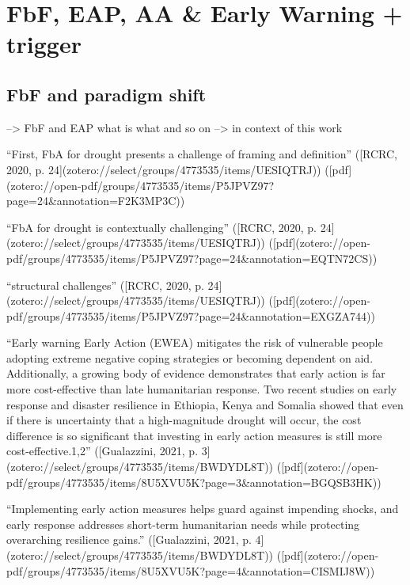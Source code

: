 {\section{FbF, EAP, AA & Early Warning + trigger}

\subsection{FbF and paradigm shift}
--> FbF and EAP what is what and so on --> in context of this work


“First, FbA for drought presents a challenge of framing and definition” ([RCRC, 2020, p. 24](zotero://select/groups/4773535/items/UESIQTRJ)) ([pdf](zotero://open-pdf/groups/4773535/items/P5JPVZ97?page=24&annotation=F2K3MP3C))

“FbA for drought is contextually challenging” ([RCRC, 2020, p. 24](zotero://select/groups/4773535/items/UESIQTRJ)) ([pdf](zotero://open-pdf/groups/4773535/items/P5JPVZ97?page=24&annotation=EQTN72CS))

“structural challenges” ([RCRC, 2020, p. 24](zotero://select/groups/4773535/items/UESIQTRJ)) ([pdf](zotero://open-pdf/groups/4773535/items/P5JPVZ97?page=24&annotation=EXGZA744))

“Early warning Early Action (EWEA) mitigates the risk of vulnerable people adopting extreme negative coping strategies or becoming dependent on aid. Additionally, a growing body of evidence demonstrates that early action is far more cost-effective than late humanitarian response. Two recent studies on early response and disaster resilience in Ethiopia, Kenya and Somalia showed that even if there is uncertainty that a high-magnitude drought will occur, the cost difference is so significant that investing in early action measures is still more cost-effective.1,2” ([Gualazzini, 2021, p. 3](zotero://select/groups/4773535/items/BWDYDL8T)) ([pdf](zotero://open-pdf/groups/4773535/items/8U5XVU5K?page=3&annotation=BGQSB3HK))

“Implementing early action measures helps guard against impending shocks, and early response addresses short-term humanitarian needs while protecting overarching resilience gains.” ([Gualazzini, 2021, p. 4](zotero://select/groups/4773535/items/BWDYDL8T)) ([pdf](zotero://open-pdf/groups/4773535/items/8U5XVU5K?page=4&annotation=CISMIJ8W))



}
